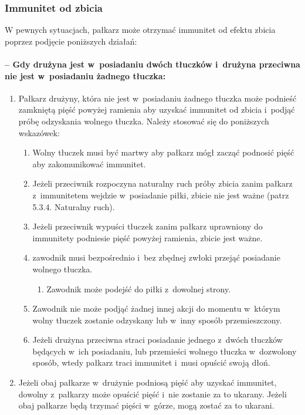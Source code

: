 \documentclass[12pt]{article}
\begin{document}
\subsubsection{Immunitet od zbicia}

W pewnych sytuacjach, pałkarz może otrzymać immunitet od efektu zbicia
poprzez podjęcie poniższych działań:

\paragraph{-- Gdy drużyna jest w~posiadaniu dwóch tłuczków i~drużyna przeciwna nie jest w~posiadaniu żadnego tłuczka:}

\begin{enumerate}
	\item
	      Pałkarz drużyny, która nie jest w~posiadaniu żadnego tłuczka może
	      podnieść zamkniętą pięść powyżej ramienia aby uzyskać immunitet od
	      zbicia i~podjąć próbę odzyskania wolnego tłuczka. Należy stosować się
	      do poniższych wskazówek:

	      \begin{enumerate}
		      \item
		            Wolny tłuczek musi być martwy aby pałkarz mógł zacząć podnosić pięść
		            aby zakomunikować immunitet.
		      \item
		            Jeżeli przeciwnik rozpoczyna naturalny ruch próby zbicia zanim
		            pałkarz z~immunitetem wejdzie w~posiadanie piłki, zbicie nie jest
		            ważne (patrz 5.3.4. Naturalny ruch).
		      \item
		            Jeżeli przeciwnik wypuści tłuczek zanim pałkarz uprawniony do
		            immunitety podniesie pięść powyżej ramienia, zbicie jest ważne.
		      \item
		            zawodnik musi bezpośrednio i~bez zbędnej zwłoki przejąć posiadanie
		            wolnego tłuczka.

		            \begin{enumerate}
			            \item
			                  Zawodnik może podejść do piłki z~dowolnej strony.
		            \end{enumerate}
		      \item
		            Zawodnik nie może podjąć żadnej innej akcji do momentu w~którym
		            wolny tłuczek zostanie odzyskany lub w~inny sposób przemieszczony.
		      \item
		            Jeżeli drużyna przeciwna straci posiadanie jednego z~dwóch tłuczków
		            będących w~ich posiadaniu, lub przemieści wolnego tłuczka w~dozwolony sposób, wtedy pałkarz traci immunitet i~musi opuścić swoją
		            dłoń.
	      \end{enumerate}
	\item
	      Jeżeli obaj pałkarze w~drużynie podniosą pięść aby uzyskać immunitet,
	      dowolny z~pałkarzy może opuścić pięść i~nie zostanie za to ukarany.
	      Jeżeli obaj pałkarze będą trzymać pięści w~górze, mogą zostać za to
	      ukarani.
\end{enumerate}
\end{document}
